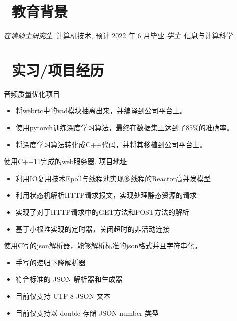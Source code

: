 \documentclass{resume}
\begin{document}



\section{\faGraduationCap\  教育背景}
\textit{在读硕士研究生}\ 计算机技术, 预计 2022 年 6 月毕业
\textit{学士}\ 信息与计算科学

\section{\faUsers\ 实习/项目经历}
 {音频质量优化项目}
\begin{itemize}
    \item 将webrtc中的vad模块抽离出来，并编译到公司平台上。
    \item 使用pytorch训练深度学习算法，最终在数据集上达到了85\%的准确率。
    \item 将深度学习算法转化成C++代码，并将其移植到公司平台上。
\end{itemize}

\begin{onehalfspacing}
    使用C++11完成的web服务器.
    项目地址
    \begin{itemize}
        \item 利用IO复用技术Epoll与线程池实现多线程的Reactor高并发模型
        \item 利用状态机解析HTTP请求报文，实现处理静态资源的请求
        \item 实现了对于HTTP请求中的GET方法和POST方法的解析
        \item 基于小根堆实现的定时器，关闭超时的非活动连接
    \end{itemize}
\end{onehalfspacing}

\begin{onehalfspacing}
    使用C写的json解析器，能够解析标准的json格式并且字符串化。
    \begin{itemize}
        \item 手写的递归下降解析器
        \item 符合标准的 JSON 解析器和生成器
        \item 目前仅支持 UTF-8 JSON 文本
        \item 目前仅支持以 double 存储 JSON number 类型
    \end{itemize}
\end{onehalfspacing}
\end{document}
